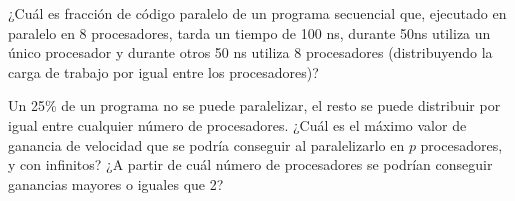 \begin{ejercicio}
    ¿Cuál es fracción de código paralelo de un programa secuencial que, ejecutado en paralelo en 8
    procesadores, tarda un tiempo de 100 ns, durante 50ns utiliza un único procesador y durante otros 50 ns
    utiliza 8 procesadores (distribuyendo la carga de trabajo por igual entre los procesadores)?
\end{ejercicio}

\begin{ejercicio}
    Un 25\% de un programa no se puede paralelizar, el resto se puede distribuir por igual entre
    cualquier número de procesadores. ¿Cuál es el máximo valor de ganancia de velocidad que se podría
    conseguir al paralelizarlo en $p$ procesadores, y con infinitos? ¿A partir de cuál número de procesadores se
    podrían conseguir ganancias mayores o iguales que 2?
\end{ejercicio}

